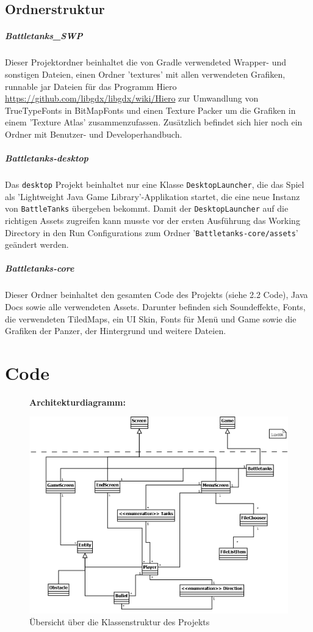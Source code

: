 \documentclass[a4paper]{scrreprt}
\def\code#1{\texttt{#1}}
\begin{document}
\subsection{Ordnerstruktur}
\subparagraph{Battletanks\_SWP} Dieser Projektordner beinhaltet die von Gradle verwendeted Wrapper- und sonstigen Dateien, einen Ordner 'textures' mit allen verwendeten Grafiken, runnable jar Dateien für das Programm Hiero \url{https://github.com/libgdx/libgdx/wiki/Hiero} zur Umwandlung von TrueTypeFonts in BitMapFonts und einen Texture Packer um die Grafiken in einem 'Texture Atlas' zusammenzufassen.
Zusätzlich befindet sich hier noch ein Ordner mit Benutzer- und Developerhandbuch.

\subparagraph{Battletanks-desktop}
Das  \code{desktop} Projekt beinhaltet nur eine Klasse \code{DesktopLauncher}, die das Spiel als 'Lightweight Java Game Library'-Applikation startet, die eine neue Instanz von \code{BattleTanks} übergeben bekommt.
Damit der \code{DesktopLauncher} auf die richtigen Assets zugreifen kann musste vor der ersten Ausführung das Working Directory in den Run Configurations zum Ordner '\code{Battletanks-core/assets}' geändert werden.

\subparagraph{Battletanks-core}
Dieser Ordner beinhaltet den gesamten Code des Projekts (siehe 2.2 Code), Java Docs sowie alle verwendeten Assets. Darunter befinden sich Soundeffekte, Fonts, die verwendeten TiledMaps, ein UI Skin, Fonts für Menü und Game sowie die Grafiken der Panzer, der Hintergrund und weitere Dateien.



\newpage
\section{Code}
\begin{figure}[H]
  \textbf{Architekturdiagramm:}\par\medskip
  \centering
\includegraphics[width=15cm]{architekturdiagramm.png}
\caption{Übersicht über die Klassenstruktur des Projekts}
\end{figure}
\begin{center}\end{center}
\end{document}
